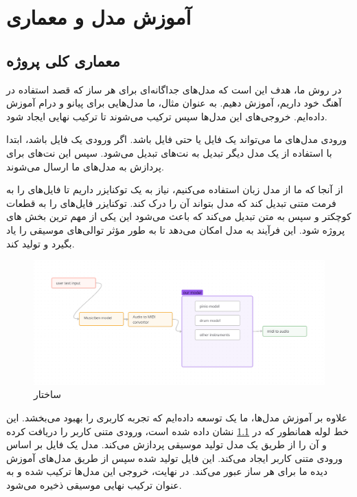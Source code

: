 
\chapter{آموزش مدل و معماری}
\section{معماری کلی پروژه}
در روش ما، هدف این است که مدل‌های جداگانه‌ای برای هر ساز که قصد استفاده در آهنگ خود داریم، آموزش دهیم. به عنوان مثال، ما مدل‌هایی برای پیانو و درام آموزش داده‌ایم. خروجی‌های این مدل‌ها سپس ترکیب می‌شوند تا ترکیب نهایی ایجاد شود.

ورودی مدل‌های ما می‌تواند یک فایل  یا حتی فایل  باشد. اگر ورودی یک فایل  باشد، ابتدا با استفاده از یک مدل دیگر تبدیل به نت‌های  تبدیل می‌شود. سپس این نت‌های  برای پردازش به مدل‌های ما ارسال می‌شوند.

از آنجا که ما از مدل زبان  استفاده می‌کنیم، نیاز به یک  توکنایزر  داریم تا فایل‌های  را به فرمت متنی تبدیل کند که مدل بتواند آن را درک کند. توکنایزر فایل‌های  را به قطعات کوچکتر و سپس به متن تبدیل می‌کند که باعث می‌شود این یکی از مهم ترین بخش های پروژه شود. این فرآیند به مدل امکان می‌دهد تا به طور مؤثر توالی‌های موسیقی را یاد بگیرد و تولید کند.

\begin{figure}[!htb]
      \centering
      \includegraphics[scale=0.3]{Figures/pipe.png}
      \caption{ساختار  
      }
      \label{Fig:Pipe}
\end{figure}


علاوه بر آموزش مدل‌ها، ما یک   توسعه داده‌ایم که تجربه کاربری را بهبود می‌بخشد. این خط لوله همانطور که در \ref{Fig:Pipe} نشان داده شده است، ورودی متنی کاربر را دریافت کرده و آن را از طریق یک مدل تولید موسیقی  \cite{copet2023simple} پردازش می‌کند. مدل  یک فایل  بر اساس ورودی متنی کاربر ایجاد می‌کند. این فایل  تولید شده سپس از طریق مدل‌های آموزش دیده ما برای هر ساز عبور می‌کند. در نهایت، خروجی این مدل‌ها ترکیب شده و به عنوان ترکیب نهایی موسیقی ذخیره می‌شود.

